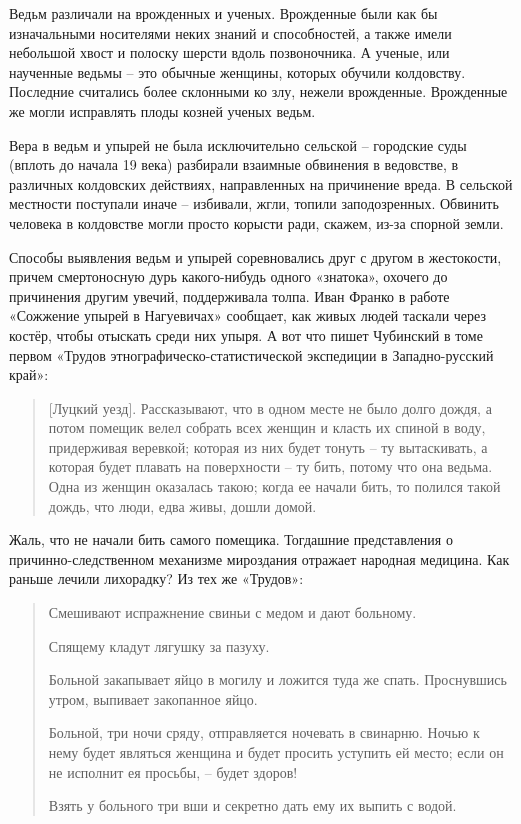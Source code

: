 
Ведьм различали на врожденных и ученых. Врожденные были как бы изначальными носителями неких знаний и способностей, а также имели небольшой хвост и полоску шерсти вдоль позвоночника. А ученые, или наученные ведьмы – это обычные женщины, которых обучили колдовству. Последние считались более склонными ко злу, нежели врожденные. Врожденные же могли исправлять плоды козней ученых ведьм.

Вера в ведьм и упырей не была исключительно сельской – городские суды (вплоть до начала 19 века) разбирали взаимные обвинения в ведовстве, в различных колдовских действиях, направленных на причинение вреда. В сельской местности поступали иначе – избивали, жгли, топили заподозренных. Обвинить человека в колдовстве могли просто корысти ради, скажем, из-за спорной земли.

Способы выявления ведьм и упырей соревновались друг с другом в жестокости, причем смертоносную дурь какого-нибудь одного «знатока», охочего до причинения другим увечий, поддерживала толпа. Иван Франко в работе «Сожжение упырей в Нагуевичах» сообщает, как живых людей таскали через костёр, чтобы отыскать среди них упыря. А вот что пишет Чубинский в томе первом «Трудов этнографическо-статистической экспедиции в Западно-русский край»\cite{trudy-chub}:

\begin{quotation}
[Луцкий уезд]. Рассказывают, что в одном месте не было долго дождя, а потом помещик велел собрать всех женщин и класть их спиной в воду, придерживая веревкой; которая из них будет тонуть – ту вытаскивать, а которая будет плавать на поверхности – ту бить, потому что она ведьма. Одна из женщин оказалась такою; когда ее начали бить, то полился такой дождь, что люди, едва живы, дошли домой.
\end{quotation}

Жаль, что не начали бить самого помещика. Тогдашние представления о причинно-следственном механизме мироздания отражает народная медицина. Как раньше лечили лихорадку? Из тех же «Трудов»:

\begin{quotation}
Смешивают испражнение свиньи с медом и дают больному.

Спящему кладут лягушку за пазуху.

Больной закапывает яйцо в могилу и ложится туда же спать. Проснувшись утром, выпивает закопанное яйцо.

Больной, три ночи сряду, отправляется ночевать в свинарню. Ночью к нему будет являться женщина и будет просить уступить ей место; если он не исполнит ея просьбы, – будет здоров!

Взять у больного три вши и секретно дать ему их выпить с водой.
\end{quotation}

